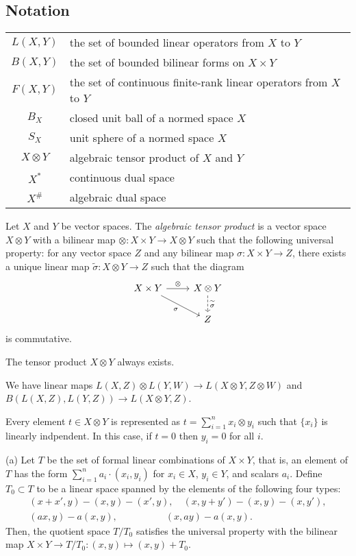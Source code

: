 \documentclass{../../large}
\begin{document}
\subsection*{Notation}
\begin{tabular}{cl}
$L(X,Y)$ & the set of bounded linear operators from $X$ to $Y$\\
$B(X,Y)$ & the set of bounded bilinear forms on $X\times Y$\\
$F(X,Y)$ & the set of continuous finite-rank linear operators from $X$ to $Y$\\
$B_X$ & closed unit ball of a normed space $X$\\
$S_X$ & unit sphere of a normed space $X$\\
$X\otimes Y$ & algebraic tensor product of $X$ and $Y$\\
$X^*$ & continuous dual space\\
$X^\#$ & algebraic dual space
\end{tabular}

\begin{prb}
Let $X$ and $Y$ be vector spaces.
The \emph{algebraic tensor product} is a vector space $X\otimes Y$ with a bilinear map $\otimes:X\times Y\to X\otimes Y$ such that the following universal property: for any vector space $Z$ and any bilinear map $\sigma:X\times Y\to Z$, there exists a unique linear map $\tilde\sigma:X\otimes Y\to Z$ such that the diagram
\[\begin{tikzcd}
X\times Y \ar{r}{\otimes}\ar[swap]{dr}{\sigma} & X\otimes Y \ar[dashed]{d}{\tilde\sigma}\\
\, & Z 
\end{tikzcd}\]
is commutative.
\begin{parts}
\item The tensor product $X\otimes Y$ always exists.
\item We have linear maps $L(X,Z)\otimes L(Y,W)\to L(X\otimes Y,Z\otimes W)$ and $B(L(X,Z),L(Y,Z))\to L(X\otimes Y,Z)$.
\item Every element $t\in X\otimes Y$ is represented as $t=\sum_{i=1}^nx_i\otimes y_i$ such that $\{x_i\}$ is linearly indpendent. In this case, if $t=0$ then $y_i=0$ for all $i$.
\end{parts}
\end{prb}
\begin{pf}
(a)
Let $T$ be the set of formal linear combinations of $X\times Y$, that is, an element of $T$ has the form $\sum_{i=1}^na_i\cdot(x_i,y_i)$ for $x_i\in X$, $y_i\in Y$, and scalars $a_i$.
Define $T_0\subset T$ to be a linear space spanned by the elements of the following four types:
\begin{gather*}
(x+x',y)-(x,y)-(x',y),\quad (x,y+y')-(x,y)-(x,y'),\\
(ax,y)-a(x,y), \quad\qquad\qquad (x,ay)-a(x,y).
\end{gather*}
Then, the quotient space $T/T_0$ satisfies the universal property with the bilinear map $X\times Y\to T/T_0:(x,y)\mapsto(x,y)+T_0$.
\end{pf}
\end{document}
